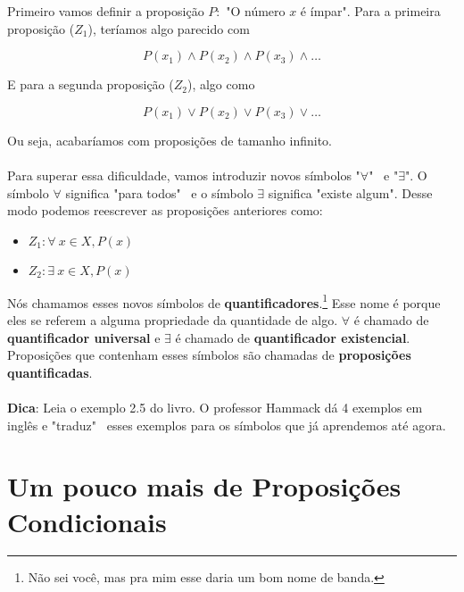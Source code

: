 \documentclass[a4paper,11pt]{book}
\theoremstyle{definition}
\theoremstyle{break}
\begin{document}
Primeiro vamos definir a proposição $P :$ "O número $x$ é ímpar". Para a primeira proposição ($Z_1$), teríamos algo parecido com 

$$P(x_1) \land P(x_2) \land P(x_3) \land \dots$$

E para a segunda proposição ($Z_2$), algo como

$$P(x_1) \lor P(x_2) \lor P(x_3) \lor \dots$$

Ou seja, acabaríamos com proposições de tamanho infinito.
\\
\\
Para superar essa dificuldade, vamos introduzir novos símbolos "$\forall$" \ e "$\exists$". O símbolo $\forall$ significa "para todos" \ e o símbolo $\exists$ significa "existe algum". Desse modo podemos reescrever as proposições anteriores como:

\begin{itemize}
\item $Z_1: \forall \ x \in X, P(x)$
\item $Z_2: \exists \ x \in X, P(x)$
\end{itemize}

Nós chamamos esses novos símbolos de \textbf{quantificadores}.\footnote{Não sei você, mas pra mim esse daria um bom nome de banda.} Esse nome é porque eles se referem a alguma propriedade da quantidade de algo. $\forall$ é chamado de \textbf{quantificador universal} e $\exists$ é chamado de \textbf{quantificador existencial}. Proposições que contenham esses símbolos são chamadas de \textbf{proposições quantificadas}.
\\
\\
\textbf{Dica}: Leia o exemplo 2.5 do livro. O professor Hammack dá 4 exemplos em inglês e "traduz" \ esses exemplos para os símbolos que já aprendemos até agora.

\section{Um pouco mais de Proposições Condicionais}
\end{document}
